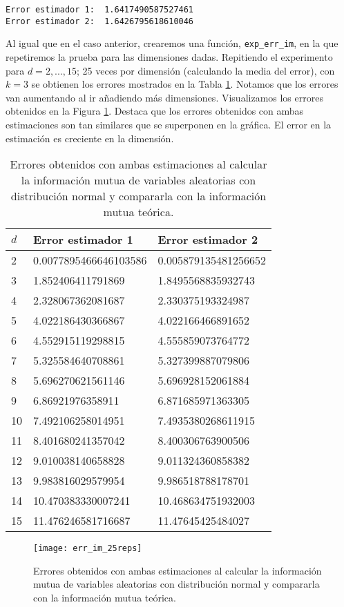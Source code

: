 \documentclass[10pt,a4paper]{article} %
\theoremstyle{definition}
\begin{document}
\begin{lstlisting}
Error estimador 1:  1.6417490587527461
Error estimador 2:  1.6426795618610046
\end{lstlisting}

Al igual que en el caso anterior, crearemos una función, \texttt{exp\_err\_im}, en la que repetiremos la prueba para las dimensiones dadas. Repitiendo el experimento para $d=2,...,15$; 25 veces por dimensión (calculando la media del error), con $k=3$ se obtienen los errores mostrados en la Tabla \ref{tab:err_im}. Notamos que los errores van aumentando al ir añadiendo más dimensiones. Visualizamos los errores obtenidos en la Figura \ref{fig:err_im}. Destaca que los errores obtenidos con ambas estimaciones son tan similares que se superponen en la gráfica. El error en la estimación es creciente en la dimensión.

\begin{table}[H]
\centering
\caption{Errores obtenidos con ambas estimaciones al calcular la información mutua de variables aleatorias con distribución normal y compararla con la información mutua teórica.}
\label{tab:err_im}
\begin{tabular}{lll}
\toprule
$d$ & Error estimador 1 & Error estimador 2\\ \midrule
2 & 0.0077895466646103586 & 0.005879135481256652\\
3 & 1.852406411791869 & 1.8495568835932743\\
4 & 2.328067362081687 & 2.330375193324987\\
5 & 4.022186430366867 & 4.022166466891652\\
6 & 4.552915119298815 & 4.555859073764772\\
7 & 5.325584640708861 & 5.327399887079806\\
8 & 5.696270621561146 & 5.696928152061884\\
9 & 6.86921976358911 & 6.871685971363305\\
10 & 7.492106258014951 & 7.4935380268611915\\
11 & 8.401680241357042 & 8.400306763900506\\
12 & 9.010038140658828 & 9.011324360858382\\
13 & 9.983816029579954 & 9.986518788178701\\
14 & 10.470383330007241 & 10.468634751932003\\
15 & 11.476246581716687 & 11.47645425484027\\
\bottomrule
\end{tabular}
\end{table}

\begin{figure}[H]
    \centering
    \texttt{[image: err\_im\_25reps]}
    \caption{Errores obtenidos con ambas estimaciones al calcular la información mutua de variables aleatorias con distribución normal y compararla con la información mutua teórica.}
    \label{fig:err_im}
\end{figure}


\newpage
\printbibliography
\end{document}
